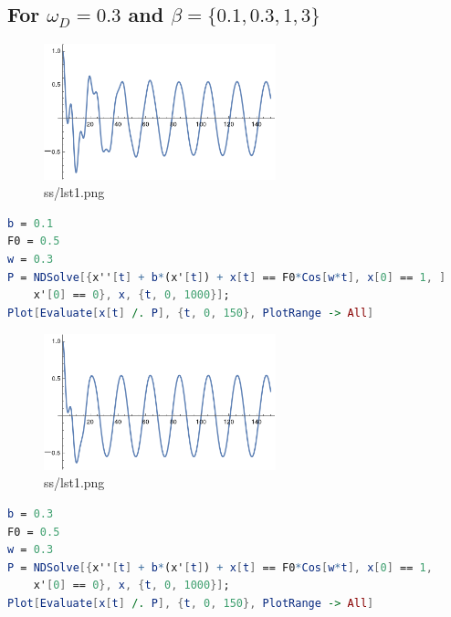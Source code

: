 \documentclass[12pt,letter]{article}
\begin{document}
{\subsection{For $\omega_D = 0.3$ and $\beta = \{0.1,0.3,1,3\}$}
\begin{tcolorbox}
	\begin{figure}[H]
		\centering
		\includegraphics[width=0.6\textwidth]{ss/sshw4/5.png}
		\caption{ss/lst1.png}
		\label{fig:ss-lst1-png}
	\end{figure}
\begin{lstlisting}[language=Mathematica]
b = 0.1
F0 = 0.5
w = 0.3
P = NDSolve[{x''[t] + b*(x'[t]) + x[t] == F0*Cos[w*t], x[0] == 1, ]
    x'[0] == 0}, x, {t, 0, 1000}];
Plot[Evaluate[x[t] /. P], {t, 0, 150}, PlotRange -> All]
\end{lstlisting}
\end{tcolorbox}


\begin{tcolorbox}
	\begin{figure}[H]
		\centering
		\includegraphics[width=0.6\textwidth]{ss/sshw4/6.png}
		\caption{ss/lst1.png}
		\label{fig:ss-lst1-png}
	\end{figure}
\begin{lstlisting}[language=Mathematica]
b = 0.3
F0 = 0.5
w = 0.3
P = NDSolve[{x''[t] + b*(x'[t]) + x[t] == F0*Cos[w*t], x[0] == 1, 
    x'[0] == 0}, x, {t, 0, 1000}];
Plot[Evaluate[x[t] /. P], {t, 0, 150}, PlotRange -> All]
\end{lstlisting}
\end{tcolorbox}

}
\end{document}
